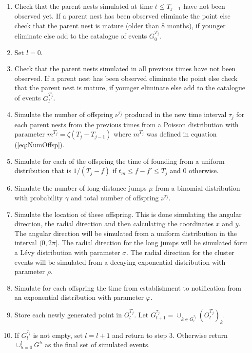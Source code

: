 \documentclass[11pt,a4paper]{article}
\begin{document}
{{\begin{enumerate}
    \item Check that the parent nests simulated at time $t \leq T_{j-1}$ have not been observed yet. If a parent nest has been observed eliminate the point else check that the parent nest is mature (older than 8 months), if younger eliminate else add to the catalogue of events $G_0^{T_j}$.
    \item Set $l = 0$.
    \item Check that the parent nests simulated in all previous times have not been observed. If a parent nest has been observed eliminate the point else check that the parent nest is mature, if younger eliminate else add to the catalogue of events $G_l^{T_j}$.
    \item Simulate the number of offspring $\nu^{\tau_j}$ produced in the new time interval $\tau_j$ for each parent nests from the previous times from a Poisson distribution with parameter $ m^{T_j} = \zeta (T_j-T_{j-1})$ where $m^{T_j}$ was defined in equation (\ref{eq:NumOffsp}).
    \item Simulate for each of the offspring the time of founding from a uniform distribution that is $1/(T_j-f)$ if $t_m \leq f - f' \leq T_j$ and $0$ otherwise.
    \item Simulate the number of long-distance jumps $\mu$ from a binomial distribution with probability $\gamma$ and total number of offspring $\nu^{\tau_j}$.
    \item Simulate the location of these offspring. This is done simulating the angular direction, the radial direction and then calculating the coordinates $x$ and $y$. The angular direction will be simulated from a uniform distribution in the interval $(0, 2\pi]$. The radial direction for the long jumps will be simulated form a L\'evy distribution with parameter $\sigma$. The radial direction for the cluster events will be simulated from a decaying exponential distribution with parameter $\rho$.
    \item Simulate for each offspring the time from establishment to notification from an exponential distribution with parameter $\varphi$.
    \item Store each newly generated point in $O_l^{T_j}$. Let $G_{l+1}^{\tau_j} = \cup_{k\in G_l^{\tau_j}} (O_l^{T_j})_k$.
    \item If $G_l^{\tau_j}$ is not empty, set $l = l+1$ and return to step 3. Otherwise return $\cup_{h=0}^l G^h$ as the final set of simulated events.
\end{enumerate}

}}
\end{document}
